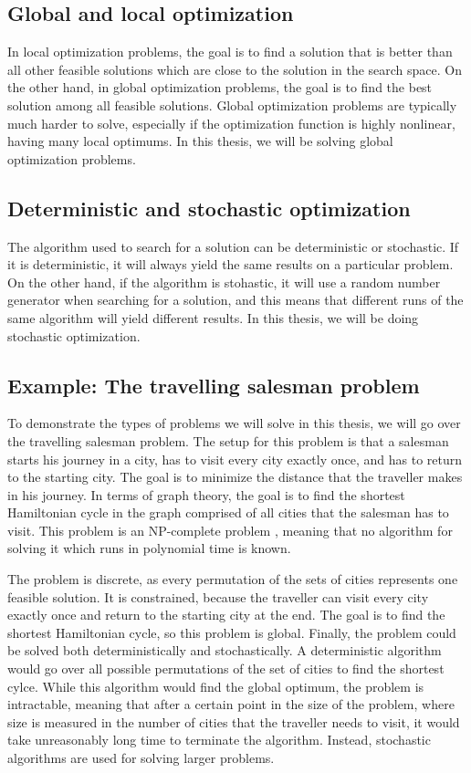 \subsection{Global and local optimization}
\label{sec:global_and_local_optimization}
In local optimization problems, the goal is to find a solution that is better than all other feasible solutions which are close to the solution in the search space. On the other hand, in global optimization problems, the goal is to find the best solution among all feasible solutions. Global optimization problems are typically much harder to solve, especially if the optimization function is highly nonlinear, having many local optimums. In this thesis, we will be solving global optimization problems.

\subsection{Deterministic and stochastic optimization}
\label{sec:deterministic_and_stochastic_optimization}
The algorithm used to search for a solution can be deterministic or stochastic. If it is deterministic, it will always yield the same results on a particular problem. On the other hand, if the algorithm is stohastic, it will use a random number generator when searching for a solution, and this means that different runs of the same algorithm will yield different results. In this thesis, we will be doing stochastic optimization.

\subsection{Example: The travelling salesman problem}
\label{sec:the_travelling_salesman_problem}
To demonstrate the types of problems we will solve in this thesis, we will go over the travelling salesman problem. The setup for this problem is that a salesman starts his journey in a city, has to visit every city exactly once, and has to return to the starting city. The goal is to minimize the distance that the traveller makes in his journey. In terms of graph theory, the goal is to find the shortest Hamiltonian cycle in the graph comprised of all cities that the salesman has to visit. This problem is an NP-complete problem \citep{sipser2012computation}, meaning that no algorithm for solving it which runs in polynomial time is known.

The problem is discrete, as every permutation of the sets of cities represents one feasible solution. It is constrained, because the traveller can visit every city exactly once and return to the starting city at the end. The goal is to find the shortest Hamiltonian cycle, so this problem is global. Finally, the problem could be solved both deterministically and stochastically. A deterministic algorithm would go over all possible permutations of the set of cities to find the shortest cylce. While this algorithm would find the global optimum, the problem is intractable, meaning that after a certain point in the size of the problem, where size is measured in the number of cities that the traveller needs to visit, it would take unreasonably long time to terminate the algorithm. Instead, stochastic algorithms are used for solving larger problems.

